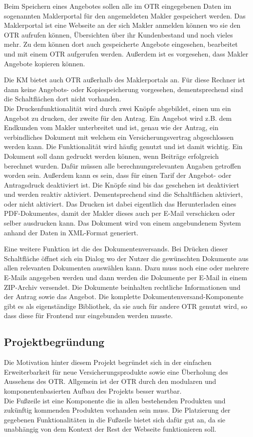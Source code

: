 Beim Speichern eines Angebotes sollen alle im \ac{OTR} eingegebenen Daten im sogenannten Maklerportal für den angemeldeten Makler gespeichert werden. Das Maklerportal ist eine Webseite an der sich Makler anmelden können wo sie den \ac{OTR} aufrufen können, Übersichten über ihr Kundenbestand und noch vieles mehr. Zu dem können dort auch gespeicherte Angebote eingesehen, bearbeitet und mit einem \ac{OTR} aufgerufen werden. 
Außerdem ist es vorgesehen, dass Makler Angebote kopieren können.

Die \ac{KM} bietet auch \ac{OTR} außerhalb des Maklerportals an. Für diese Rechner ist dann keine Angebots- oder Kopiespeicherung vorgesehen, dementsprechend sind die Schaltflächen dort nicht vorhanden. \\

Die Druckenfunktionalität wird durch zwei Knöpfe abgebildet, einen um ein Angebot zu drucken, der zweite für den Antrag. Ein Angebot wird z.B. dem Endkunden vom Makler unterbreitet und ist, genau wie der Antrag, ein verbindliches Dokument mit welchem ein Versicherungsvertrag abgeschlossen werden kann. Die Funktionalität wird häufig genutzt und ist damit wichtig. Ein Dokument soll dann gedruckt werden können, wenn Beiträge erfolgreich berechnet wurden. Dafür müssen alle berechnungsrelevanten Angaben getroffen worden sein. Außerdem kann es sein, dass für einen Tarif der Angebot- oder Antragsdruck deaktiviert ist.
 Die Knöpfe sind bis das geschehen ist deaktiviert und werden reaktiv aktiviert.  Dementsprechend sind die Schaltflächen aktiviert, oder nicht aktiviert. Das Drucken ist dabei eigentlich das Herunterladen eines PDF-Dokumentes, damit der Makler dieses auch per E-Mail verschicken oder selber ausdrucken kann. Das Dokument wird von einem angebundenem System anhand der Daten in XML-Format generiert.

Eine weitere Funktion ist die des Dokumentenversands. Bei Drücken dieser Schaltfläche öffnet sich ein Dialog wo der Nutzer die gewünschten Dokumente aus allen relevanten Dokumenten auswählen kann. Dazu muss noch eine oder mehrere E-Mails angegeben werden und dann werden die Dokumente per E-Mail in einem ZIP-Archiv versendet. Die Dokumente beinhalten rechtliche Informationen und der Antrag sowie das Angebot. Die komplette Dokumentenversand-Komponente gibt es als eigenständige Bibliothek, da sie auch für andere \ac{OTR} genutzt wird, so dass diese für Frontend nur eingebunden werden musste.

\subsection{Projektbegründung}
\label{projektbegründung}
Die Motivation hinter diesem Projekt begründet sich in der einfachen Erweiterbarkeit für neue Versicherungsprodukte sowie eine Überholung des Aussehens des \ac{OTR}. Allgemein ist der \ac{OTR} durch den modularen und komponentenbasierten Aufbau des Projekts besser wartbar. \\
Die Fußzeile ist eine Komponente die in allen bestehenden Produkten und zukünftig kommenden Produkten vorhanden sein muss. Die Platzierung der gegebenen Funktionalitäten in die Fußzeile bietet sich dafür gut an, da sie unabhängig von dem Kontext der Rest der Webseite funktionieren soll.
